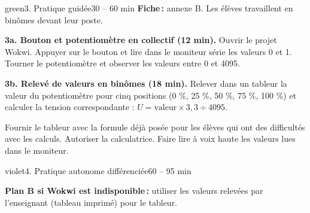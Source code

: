 \documentclass[11pt,a4paper]{article}
\begin{document}
\begin{etape}{green}{3. Pratique guidée}{30 -- 60 min}
\textbf{Fiche\,:} annexe B. Les élèves travaillent en binômes devant leur poste.

\textbf{3a. Bouton et potentiomètre en collectif (12 min).} Ouvrir le projet Wokwi. Appuyer sur le bouton et lire dans le moniteur série les valeurs 0 et 1. Tourner le potentiomètre et observer les valeurs entre 0 et 4095.

\textbf{3b. Relevé de valeurs en binômes (18 min).} Relever dans un tableur la valeur du potentiomètre pour cinq positions (0 \%, 25 \%, 50 \%, 75 \%, 100 \%) et calculer la tension correspondante : $U = \text{valeur} \times 3{,}3 \div 4095$.


\begin{astuce}
Fournir le tableur avec la formule déjà posée pour les élèves qui ont des difficultés avec les calculs. Autoriser la calculatrice. Faire lire à voix haute les valeurs lues dans le moniteur.
\end{astuce}
\end{etape}

\begin{etape}{violet}{4. Pratique autonome différenciée}{60 -- 95 min}

\medskip
\textbf{Plan B si Wokwi est indisponible\,:} utiliser les valeurs relevées par l'enseignant (tableau imprimé) pour le tableur.
\end{etape}
\end{document}

